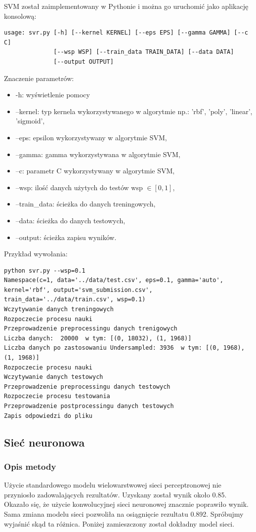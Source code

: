 \documentclass[12pt]{article}
\begin{document}
SVM został zaimplementowany w Pythonie i można go uruchomić jako aplikację konsolową:

\begin{lstlisting}
usage: svr.py [-h] [--kernel KERNEL] [--eps EPS] [--gamma GAMMA] [--c C]
              [--wsp WSP] [--train_data TRAIN_DATA] [--data DATA]
              [--output OUTPUT]

\end{lstlisting}

Znaczenie parametrów:

\begin{itemize}
    \item -h: wyświetlenie pomocy
    \item --kernel: typ kernela wykorzystywanego w algorytmie np.: 'rbf', 'poly', 'linear', 'sigmoid',
    \item --eps: epsilon wykorzystywany w algorytmie SVM,
    \item --gamma: gamma wykorzystywana w algorytmie SVM,
    \item --c: parametr C wykorzystywany w algorytmie SVM,
    \item --wsp: ilość danych użytych do testów wsp $\in [0,1]$,
    \item --train{\_}data: ścieżka do danych treningowych,
    \item --data: ścieżka do danych testowych,
    \item --output: ścieżka zapisu wyników.
\end{itemize}
\newpage
Przykład wywołania:
\begin{lstlisting}
python svr.py --wsp=0.1
Namespace(c=1, data='../data/test.csv', eps=0.1, gamma='auto', kernel='rbf', output='svm_submission.csv', train_data='../data/train.csv', wsp=0.1)
Wczytywanie danych treningowych
Rozpoczecie procesu nauki
Przeprowadzenie preprocessingu danych trenigowych
Liczba danych:  20000  w tym: [(0, 18032), (1, 1968)]
Liczba danych po zastosowaniu Undersampled: 3936  w tym: [(0, 1968), (1, 1968)]
Rozpoczecie procesu nauki
Wczytywanie danych testowych
Przeprowadzenie preprocessingu danych testowych
Rozpoczecie procesu testowania
Przeprowadzenie postprocessingu danych testowych
Zapis odpowiedzi do pliku
\end{lstlisting}


\subsection{Sieć neuronowa}

\subsubsection{Opis metody}
Użycie standardowego modelu wielowarstwowej sieci perceptronowej nie przyniosło zadowalających rezultatów. Uzyskany został wynik około 0.85. Okazało się, że użycie konwolucyjnej sieci neuronowej znacznie poprawiło wynik. Sama zmiana modelu sieci pozwoliła na osiągnięcie rezultatu 0.892. Spróbujmy wyjaśnić skąd ta różnica. Poniżej zamieszczony został dokładny model sieci.
\end{document}
